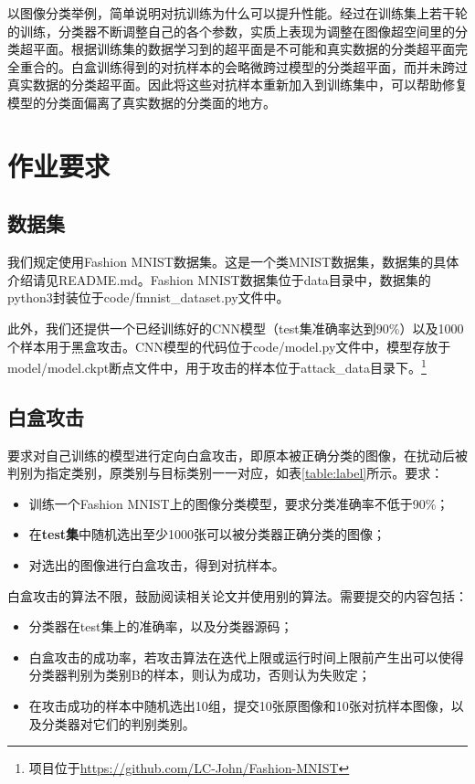 \documentclass[journal, a4paper]{IEEEtran}
\begin{document}
以图像分类举例，简单说明对抗训练为什么可以提升性能。经过在训练集上若干轮的训练，分类器不断调整自己的各个参数，实质上表现为调整在图像超空间里的分类超平面。根据训练集的数据学习到的超平面是不可能和真实数据的分类超平面完全重合的。白盒训练得到的对抗样本的会略微跨过模型的分类超平面，而并未跨过真实数据的分类超平面。因此将这些对抗样本重新加入到训练集中，可以帮助修复模型的分类面偏离了真实数据的分类面的地方。

\section{作业要求}
\label{section:requirement}

\subsection{数据集}
\label{section:requirement;subsection:dataset}

我们规定使用Fashion MNIST数据集。这是一个类MNIST数据集，数据集的具体介绍请见README.md。Fashion MNIST数据集位于data目录中，数据集的python3封装位于code/fmnist\_dataset.py文件中。

此外，我们还提供一个已经训练好的CNN模型（test集准确率达到90\%）以及1000个样本用于黑盒攻击。CNN模型的代码位于code/model.py文件中，模型存放于model/model.ckpt断点文件中，用于攻击的样本位于attack\_data目录下。\footnote{项目位于\url{https://github.com/LC-John/Fashion-MNIST}}

\subsection{白盒攻击}
\label{section:requirement;subsection:white-box attack}

要求对自己训练的模型进行定向白盒攻击，即原本被正确分类的图像，在扰动后被判别为指定类别，原类别与目标类别一一对应，如表\ref{table:label}所示。要求：

\begin{itemize}
    \item 训练一个Fashion MNIST上的图像分类模型，要求分类准确率不低于90\%；
    \item 在\textbf{test集}中随机选出至少1000张可以被分类器正确分类的图像；
    \item 对选出的图像进行白盒攻击，得到对抗样本。
\end{itemize}

白盒攻击的算法不限，鼓励阅读相关论文并使用别的算法。需要提交的内容包括：

\begin{itemize}
    \item 分类器在test集上的准确率，以及分类器源码；
    \item 白盒攻击的成功率，若攻击算法在迭代上限或运行时间上限前产生出可以使得分类器判别为类别B的样本，则认为成功，否则认为失败定；
    \item 在攻击成功的样本中随机选出10组，提交10张原图像和10张对抗样本图像，以及分类器对它们的判别类别。
\end{itemize}
\end{document}
